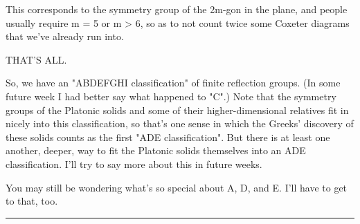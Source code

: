 This corresponds to the symmetry group of the 2m-gon in the plane,
and people usually require m = 5 or m > 6, so as to not count
twice some Coxeter diagrams that we've already run into.

THAT'S ALL.

So, we have an "ABDEFGHI classification" of finite reflection groups.
(In some future week I had better say what happened to "C".)  Note
that the symmetry groups of the Platonic solids and some of their
higher-dimensional relatives fit in nicely into this classification,
so that's one sense in which the Greeks' discovery of these solids
counts as the first "ADE classification".  But there is at least one
another, deeper, way to fit the Platonic solids themselves into an ADE
classification.  I'll try to say more about this in future weeks.

You may still be wondering what's so special about A, D, and E.  
I'll have to get to that, too.


\par\noindent\rule{\textwidth}{0.4pt}


